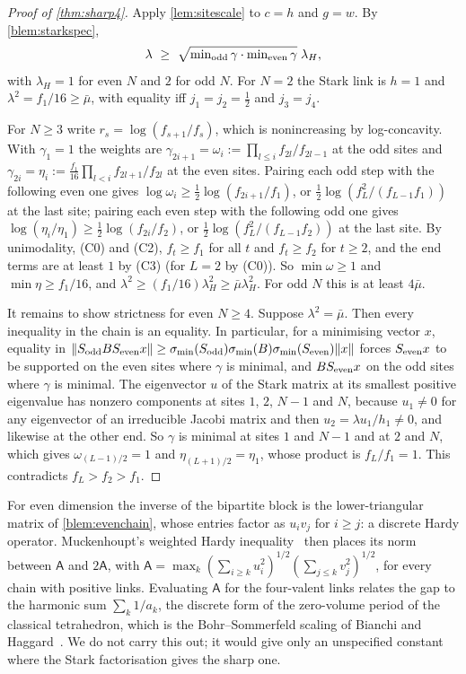 \begin{proof}[Proof of \cref{thm:sharp4}]
Apply \cref{lem:sitescale} to $c=h$ and $g=w$. By \cref{blem:starkspec},
\[
  \lambda\ \ge\ \sqrt{\textstyle\min_{\rm odd}\gamma\cdot\min_{\rm even}\gamma}\;\lambda_H,
\]
with $\lambda_H=1$ for even $N$ and $2$ for odd $N$. For $N=2$ the Stark link is $h=1$ and
$\lambda^2=f_1/16\ge\bar\mu$, with equality iff $j_1=j_2=\frac12$ and $j_3=j_4$.

For $N\ge3$ write $r_s=\log(f_{s+1}/f_s)$, which is nonincreasing by log-concavity.
With $\gamma_1=1$ the weights are $\gamma_{2i+1}=\omega_i:=\prod_{l\le i}f_{2l}/f_{2l-1}$ at the
odd sites and $\gamma_{2i}=\eta_i:=\frac{f_1}{16}\prod_{l<i}f_{2l+1}/f_{2l}$ at the even
sites. Pairing each odd step with the following even one gives
$\log\omega_i\ge\frac12\log(f_{2i+1}/f_1)$, or $\frac12\log(f_L^2/(f_{L-1}f_1))$ at the
last site; pairing each even step with the following odd one gives
$\log(\eta_i/\eta_1)\ge\frac12\log(f_{2i}/f_2)$, or $\frac12\log(f_L^2/(f_{L-1}f_2))$ at
the last site. By unimodality, (C0) and (C2), $f_t\ge f_1$ for all $t$ and $f_t\ge f_2$
for $t\ge2$, and the end terms are at least $1$ by (C3) (for $L=2$ by (C0)). So $\min\omega\ge1$ and $\min\eta\ge f_1/16$, and $\lambda^2\ge(f_1/16)\lambda_H^2\ge\bar\mu\lambda_H^2$. For odd
$N$ this is at least $4\bar\mu$.

It remains to show strictness for even $N\ge4$. Suppose $\lambda^2=\bar\mu$. Then every
inequality in the chain is an equality. In particular, for a minimising vector $x$, equality in $\|S_{\rm odd}BS_{\rm even}x\|\ge\sigma_{\min}(S_{\rm odd})
\sigma_{\min}(B)\sigma_{\min}(S_{\rm even})\|x\|$ forces $S_{\rm even}x$ to be supported on the even
sites where $\gamma$ is minimal, and $BS_{\rm even}x$ on the odd sites where $\gamma$ is
minimal. The eigenvector $u$ of the Stark matrix at its smallest positive eigenvalue
has nonzero components at sites $1$, $2$, $N-1$ and $N$, because $u_1\ne0$ for any
eigenvector of an irreducible Jacobi matrix and then $u_2=\lambda u_1/h_1\ne0$, and
likewise at the other end. So $\gamma$ is minimal at sites $1$ and $N-1$ and at $2$ and
$N$, which gives $\omega_{(L-1)/2}=1$ and $\eta_{(L+1)/2}=\eta_1$, whose product is $f_L/f_1=1$.
This contradicts $f_L>f_2>f_1$.
\end{proof}

\begin{remark}
For even dimension the inverse of the bipartite block is the lower-triangular matrix
of \cref{blem:evenchain}, whose entries factor as $u_iv_j$ for $i\ge j$: a discrete
Hardy operator. Muckenhoupt's weighted Hardy inequality~\cite{Muckenhoupt1972} then
places its norm between $\mathsf A$ and $2\mathsf A$, with
$\mathsf A=\max_k(\sum_{i\ge k}u_i^2)^{1/2}(\sum_{j\le k}v_j^2)^{1/2}$, for every chain
with positive links. Evaluating $\mathsf A$ for the four-valent links relates the gap
to the harmonic sum $\sum_k1/a_k$, the discrete form of the zero-volume period of the
classical tetrahedron, which is the Bohr--Sommerfeld scaling of Bianchi and
Haggard~\cite{BH2012}. We do not carry this out; it would give only an unspecified
constant where the Stark factorisation gives the sharp one.
\end{remark}
